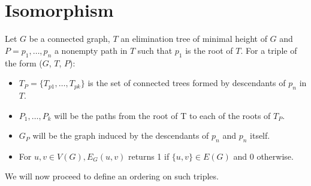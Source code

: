 \section{Isomorphism}
\begin{definition}
Let $G$ be a connected graph, $T$ an elimination tree of minimal height of $G$ and $P = p_1,\ldots, p_n$ a nonempty path in $T$ such that $p_1$ is the root of $T$. For a triple of the form ($G$, $T$, $P$):
  
\begin{itemize}
 \item $T_P = \{T_{p1}, \ldots, T_{pk}\}$ is the set of connected trees formed by descendants of $p_n$ in $T$.
 \item $P_1, \ldots, P_k$ will be the paths from the root of T to each of the roots of $T_P$.
 \item $G_P$ will be the graph induced by the descendants of $p_n$ and $p_n$ itself.
 \item For $u,v \in V(G), E_G(u, v)$ returns 1 if $\{u, v\} \in E(G)$ and 0 otherwise.
 \end{itemize}
We will now proceed to define an ordering on such triples.
\end{definition}
 
